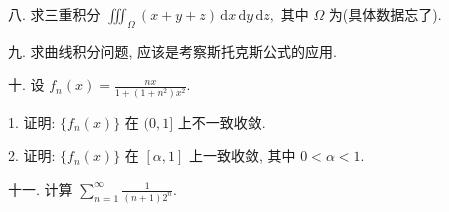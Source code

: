 \documentclass{examcollection}
\begin{document}
{\begin{minipage}{\textwidth}
八. 求三重积分 $\iiint_{\Omega} (x + y + z) \, \mathrm{d}x \, \mathrm{d}y \, \mathrm{d}z,$ 其中 $\Omega$ 为(具体数据忘了).\par
九. 求曲线积分问题, 应该是考察斯托克斯公式的应用.\par
十. 设 $f_{n}(x) = \frac{nx}{1 + (1 + n^{2})x^{2}}$.\par
1. 证明: $\{f_n(x)\}$ 在 $(0,1]$ 上不一致收敛.\par
2. 证明: $\{f_n(x)\}$ 在 $[\alpha, 1]$ 上一致收敛, 其中 $0 < \alpha < 1$.\par
十一. 计算 $\sum_{n=1}^{\infty} \frac{1}{(n+1)2^n}$.\par
\end{minipage}}
\ifdim\dimexpr\ht\proofbox+\dp\proofbox\relax>\textheight
\noindent\resizebox{!}{\textheight}{\usebox{\proofbox}}\else\noindent\usebox{\proofbox}\fi\clearpage
\end{document}
